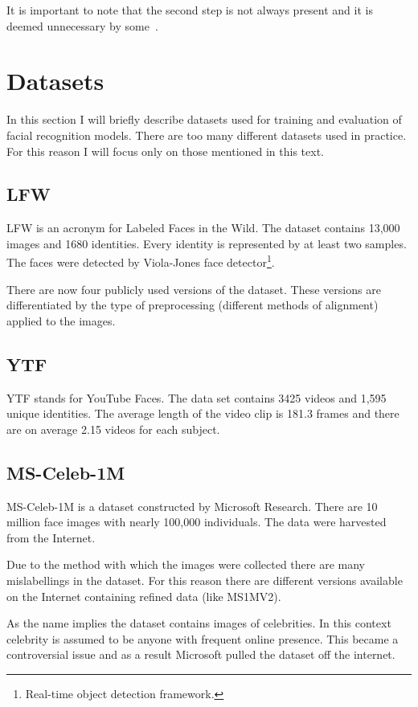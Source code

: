 It is important to note that the second step is not always present and it is deemed unnecessary by some~\cite{FaceNet}.

\section{Datasets}\label{sec:datasets}
In this section I will briefly describe datasets used for training and evaluation of facial recognition models.
There are too many different datasets used in practice.
For this reason I will focus only on those mentioned in this text.

\subsection{LFW}\label{subsec:lfw}
LFW is an acronym for Labeled Faces in the Wild.
The dataset contains 13,000 images and 1680 identities.
Every identity is represented by at least two samples.
The faces were detected by Viola-Jones face detector\footnote{Real-time object detection framework.}.

There are now four publicly used versions of the dataset.
These versions are differentiated by the type of preprocessing (different methods of alignment) applied to the images.

\subsection{YTF}\label{subsec:ytf}
YTF stands for YouTube Faces.
The data set contains 3425 videos and 1,595 unique identities.
The average length of the video clip is 181.3 frames and there are on average 2.15 videos for each subject.

\subsection{MS-Celeb-1M}\label{subsec:ms1m}
MS-Celeb-1M is a dataset constructed by Microsoft Research.
There are 10 million face images with nearly 100,000 individuals.
The data were harvested from the Internet.

Due to the method with which the images were collected there are many mislabellings in the dataset.
For this reason there are different versions available on the Internet containing refined data (like MS1MV2).

As the name implies the dataset contains images of celebrities.
In this context celebrity is assumed to be anyone with frequent online presence.
This became a controversial issue and as a result Microsoft pulled the dataset off the internet.

